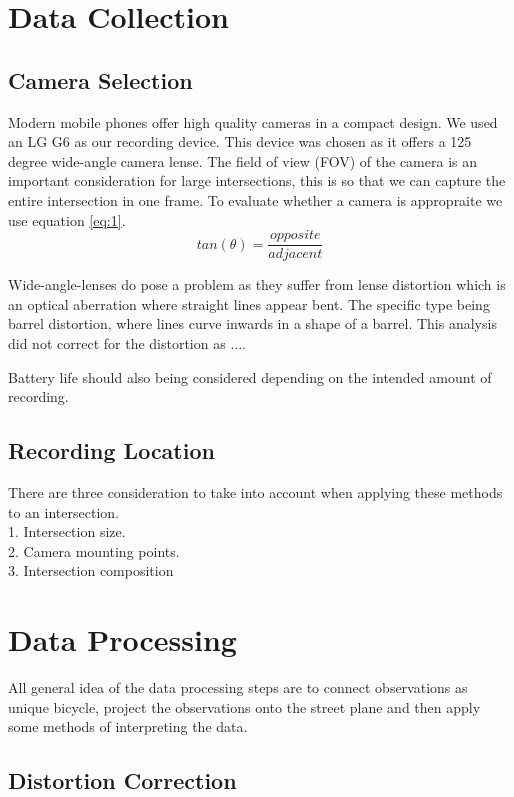\documentclass[
10pt, %
a4paper, %
oneside, %
headinclude,footinclude, %
] {book}%
\begin{document}
\section{Data Collection}

\subsection{Camera Selection}

Modern mobile phones offer high quality cameras in a compact design. We used an LG G6 as our recording device.
This device was chosen as it offers a 125 degree wide-angle camera lense. The field of view (FOV) of the camera is an important consideration
for large intersections, this is so that we can capture the entire intersection in one frame. To evaluate whether a camera is appropraite we use equation \ref{eq:1}.
\begin{equation}
    tan(\theta ) = \frac{opposite}{adjacent}\label{eq:1}
  \end{equation}

Wide-angle-lenses do pose a problem as they suffer from lense distortion which is an optical aberration where straight lines appear bent.
The specific type being barrel distortion, where lines curve inwards in a shape of a barrel. This analysis did not correct for the distortion as ....

Battery life should also being considered depending on the intended amount of recording.

\subsection{Recording Location}

There are three consideration to take into account when applying these methods to an intersection.
\ \\
1. Intersection size.
\ \\
2. Camera mounting points.
\ \\
3. Intersection composition

\section{Data Processing}

All general idea of the data processing steps are to connect observations as unique bicycle,
project the observations onto the street plane and then apply some methods of interpreting the data.

\subsection{Distortion Correction}
\end{document}
